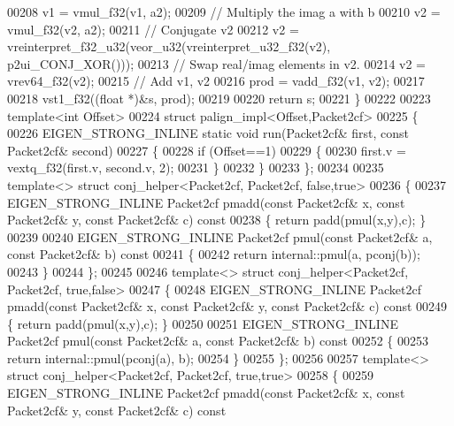 \begin{DoxyCode}
00208   v1 = vmul\_f32(v1, a2);
00209   \textcolor{comment}{// Multiply the imag a with b}
00210   v2 = vmul\_f32(v2, a2);
00211   \textcolor{comment}{// Conjugate v2 }
00212   v2 = vreinterpret\_f32\_u32(veor\_u32(vreinterpret\_u32\_f32(v2), p2ui\_CONJ\_XOR()));
00213   \textcolor{comment}{// Swap real/imag elements in v2.}
00214   v2 = vrev64\_f32(v2);
00215   \textcolor{comment}{// Add v1, v2}
00216   prod = vadd\_f32(v1, v2);
00217 
00218   vst1\_f32((\textcolor{keywordtype}{float} *)&s, prod);
00219 
00220   \textcolor{keywordflow}{return} s;
00221 \}
00222 
00223 \textcolor{keyword}{template}<\textcolor{keywordtype}{int} Offset>
00224 \textcolor{keyword}{struct }palign\_impl<Offset,Packet2cf>
00225 \{
00226   EIGEN\_STRONG\_INLINE \textcolor{keyword}{static} \textcolor{keywordtype}{void} run(Packet2cf& first, \textcolor{keyword}{const} Packet2cf& second)
00227   \{
00228     \textcolor{keywordflow}{if} (Offset==1)
00229     \{
00230       first.v = vextq\_f32(first.v, second.v, 2);
00231     \}
00232   \}
00233 \};
00234 
00235 \textcolor{keyword}{template}<> \textcolor{keyword}{struct }conj\_helper<Packet2cf, Packet2cf, false,true>
00236 \{
00237   EIGEN\_STRONG\_INLINE Packet2cf pmadd(\textcolor{keyword}{const} Packet2cf& x, \textcolor{keyword}{const} Packet2cf& y, \textcolor{keyword}{const} Packet2cf& c)\textcolor{keyword}{ const}
00238 \textcolor{keyword}{  }\{ \textcolor{keywordflow}{return} padd(pmul(x,y),c); \}
00239 
00240   EIGEN\_STRONG\_INLINE Packet2cf pmul(\textcolor{keyword}{const} Packet2cf& a, \textcolor{keyword}{const} Packet2cf& b)\textcolor{keyword}{ const}
00241 \textcolor{keyword}{  }\{
00242     \textcolor{keywordflow}{return} internal::pmul(a, pconj(b));
00243   \}
00244 \};
00245 
00246 \textcolor{keyword}{template}<> \textcolor{keyword}{struct }conj\_helper<Packet2cf, Packet2cf, true,false>
00247 \{
00248   EIGEN\_STRONG\_INLINE Packet2cf pmadd(\textcolor{keyword}{const} Packet2cf& x, \textcolor{keyword}{const} Packet2cf& y, \textcolor{keyword}{const} Packet2cf& c)\textcolor{keyword}{ const}
00249 \textcolor{keyword}{  }\{ \textcolor{keywordflow}{return} padd(pmul(x,y),c); \}
00250 
00251   EIGEN\_STRONG\_INLINE Packet2cf pmul(\textcolor{keyword}{const} Packet2cf& a, \textcolor{keyword}{const} Packet2cf& b)\textcolor{keyword}{ const}
00252 \textcolor{keyword}{  }\{
00253     \textcolor{keywordflow}{return} internal::pmul(pconj(a), b);
00254   \}
00255 \};
00256 
00257 \textcolor{keyword}{template}<> \textcolor{keyword}{struct }conj\_helper<Packet2cf, Packet2cf, true,true>
00258 \{
00259   EIGEN\_STRONG\_INLINE Packet2cf pmadd(\textcolor{keyword}{const} Packet2cf& x, \textcolor{keyword}{const} Packet2cf& y, \textcolor{keyword}{const} Packet2cf& c)\textcolor{keyword}{ const}

\end{DoxyCode}
